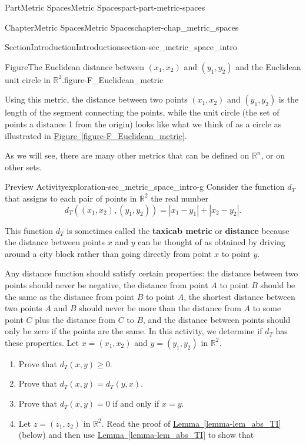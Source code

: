 \documentclass[oneside,10pt,]{book}
\newcommand{\xreffont}{\relax}
\newcommand{\terminology}[1]{\textbf{#1}}
\numberwithin{equation}{chapter}
\newcommand{\R}{\mathbb{R}}
\begin{document}
\begin{partptx}{Part}{Metric Spaces}{}{Metric Spaces}{}{}{part-part-metric-spaces}
\begin{chapterptx}{Chapter}{Metric Spaces}{}{Metric Spaces}{}{}{chapter-chap_metric_spaces}
\begin{sectionptx}{Section}{Introduction}{}{Introduction}{}{}{section-sec_metric_space_intro}
\begin{figureptx}{Figure}{The Euclidean distance between \((x_1,x_2)\) and \((y_1,y_2)\) and the Euclidean unit circle in \(\R^2\).}{figure-F_Euclidean_metric}{}
\begin{image}{0.125}{0.75}{0.125}{}
\end{image}%
\tcblower
\end{figureptx}%
Using this metric, the distance between two points \((x_1,x_2)\) and \((y_1,y_2)\) is the length of the segment connecting the points, while the unit circle (the set of points a distance 1 from the origin) looks like what we think of as a circle as illustrated in \hyperref[figure-F_Euclidean_metric]{Figure~{\xreffont\ref{figure-F_Euclidean_metric}}}.%
\par
As we will see, there are many other metrics that can be defined on \(\R^n\), or on other sets.%
\begin{exploration}{Preview Activity}{}{exploration-sec_metric_space_intro-g}%
%
Consider the function \(d_T\) that assigns to each pair of points in \(\R^2\) the real number%
\begin{equation*}
d_T((x_1,x_2),(y_1,y_2)) = | x_1-y_1 | + | x_2-y_2 |\text{.}
\end{equation*}
%
\par
This function \(d_T\) is sometimes called the \terminology{taxicab metric} or \terminology{distance} because the distance between points \(x\) and \(y\) can be thought of as obtained by driving around a city block rather than going directly from point \(x\) to point \(y\).%
\par
Any distance function should satisfy certain properties: the distance between two points should never be negative, the distance from point \(A\) to point \(B\) should be the same as the distance from point \(B\) to point \(A\), the shortest distance between two points \(A\) and \(B\) should never be more than the distance from \(A\) to some point \(C\) plus the distance from \(C\) to \(B\), and the distance between points should only be zero if the points are the same. In this activity, we determine if \(d_T\) has these properties. Let \(x=(x_1,x_2)\) and \(y=(y_1,y_2)\) in \(\R^2\).%
\begin{enumerate}[font=\bfseries,label=(\alph*),ref=\alph*]%
\item{}Prove that \(d_T(x,y) \geq 0\).%
\item{}Prove that \(d_T(x,y) = d_T(y,x)\).%
\item{}Prove that \(d_T(x,y) = 0\) if and only if \(x = y\).%
\item{}Let \(z = (z_1,z_2)\) in \(\R^2\). Read the proof of \hyperref[lemma-lem_abs_TI]{Lemma~{\xreffont\ref{lemma-lem_abs_TI}}} (below) and then use \hyperref[lemma-lem_abs_TI]{Lemma~{\xreffont\ref{lemma-lem_abs_TI}}} to show that%

\end{enumerate}
\end{exploration}
\end{sectionptx}
\end{chapterptx}
\end{partptx}
\end{document}
